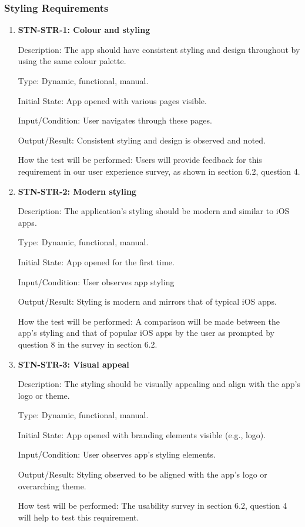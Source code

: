 \documentclass[12pt, titlepage]{article}
\begin{document}
    \subsubsection{Styling Requirements}

    \begin{enumerate}

        \item {\textbf{STN-STR-1: Colour and styling}}

        Description: The app should have consistent styling and design throughout by using the same colour palette.

        Type: Dynamic, functional, manual.

        Initial State: App opened with various pages visible.

        Input/Condition: User navigates through these pages.

        Output/Result: Consistent styling and design is observed and noted.

        How the test will be performed: Users will provide feedback for this requirement in our user experience survey, as shown in section 6.2, question 4.

        \item{\textbf{STN-STR-2: Modern styling}}

        Description: The application’s styling should be modern and similar to iOS apps.

        Type: Dynamic, functional, manual.

        Initial State: App opened for the first time.

        Input/Condition: User observes app styling

        Output/Result: Styling is modern and mirrors that of typical iOS apps.

        How the test will be performed: A comparison will be made between the app's styling and that of popular iOS apps by the user as prompted by question 8 in the survey in section 6.2.


        \item{\textbf{STN-STR-3: Visual appeal}}

        Description: The styling should be visually appealing and align with the app’s logo or theme.

        Type: Dynamic, functional, manual.

        Initial State: App opened with branding elements visible (e.g., logo).

        Input/Condition: User observes app's styling elements.

        Output/Result: Styling observed to be aligned with the app's logo or overarching theme.

        How test will be performed: The usability survey in section 6.2, question 4 will help to test this requirement.

    \end{enumerate}
\end{document}
